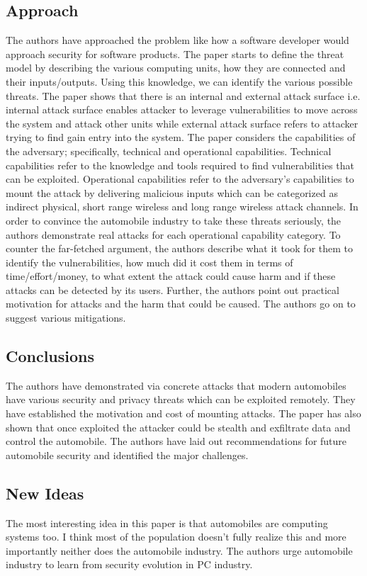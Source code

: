 \documentclass[12pt]{article}
\begin{document}
    \subsection*{Approach}
    The authors have approached the problem like how a software developer would approach security for software products. The paper starts to define the threat model by describing the various computing units, how they are connected and their inputs/outputs. Using this knowledge, we can identify the various possible threats. The paper shows that there is an internal and external attack surface i.e. internal attack surface enables attacker to leverage vulnerabilities to move across the system and attack other units while external attack surface refers to attacker trying to find gain entry into the system. The paper considers the capabilities of the adversary; specifically, technical and operational capabilities. Technical capabilities refer to the knowledge and tools required to find vulnerabilities that can be exploited. Operational capabilities refer to the adversary's capabilities to mount the attack by delivering malicious inputs which can be categorized as indirect physical, short range wireless and long range wireless attack channels. In order to convince the automobile industry to take these threats seriously, the authors demonstrate real attacks for each operational capability category. To counter the far-fetched argument, the authors describe what it took for them to identify the vulnerabilities, how much did it cost them in terms of time/effort/money, to what extent the attack could cause harm and if these attacks can be detected by its users. Further, the authors point out practical motivation for attacks and the harm that could be caused. The authors go on to suggest various mitigations.
    
    \subsection*{Conclusions}
    The authors have demonstrated via concrete attacks that modern automobiles have various security and privacy threats which can be exploited remotely. They have established the motivation and cost of mounting attacks. The paper has also shown that once exploited the attacker could be stealth and exfiltrate data and control the automobile. The authors have laid out recommendations for future automobile security and identified the major challenges.

    \subsection*{New Ideas}
    The most interesting idea in this paper is that automobiles are computing systems too. I think most of the population doesn't fully realize this and more importantly neither does the automobile industry. The authors urge automobile industry to learn from security evolution in PC industry.
\end{document}
